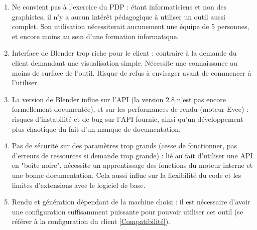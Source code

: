 \documentclass[a4paper]{article}
\begin{document}
    \begin{enumerate}
                
                \item {Ne convient pas à l'exercice du PDP :}
                étant informaticiens et non des graphistes, il n'y a aucun intérêt pédagogique à utiliser un outil aussi complet. Son utilisation nécessiterait aucunement une équipe de 5 personnes, et encore moins au sein d'une formation informatique.
                
                \item {Interface de Blender trop riche pour le client :}
                contraire à la demande du client demandant une visualisation simple. Nécessite une connaissance au moins de surface de l'outil. Risque de refus à envisager avant de commencer à l'utiliser.
                
                \item {La version de Blender influe sur l'API (la version 2.8 n'est pas encore formellement documentée), et sur les performances de rendu (moteur Evee) :}
                risques d'instabilité et de bug sur l'API fournie, ainsi qu'un développement plus chaotique du fait d'un manque de documentation.
                
                \item {Pas de sécurité sur des paramètres trop grands (cesse de fonctionner, pas d'erreurs de ressources si demande trop grande) :}
                lié au fait d'utiliser une API en "boîte noire", nécessite un apprentissage des fonctions du moteur interne et une bonne documentation. Cela aussi influe sur la flexibilité du code et les limites d'extensions avec le logiciel de base.
                
                \item {Rendu et génération dépendant de la machine choisi :}
                il est nécessaire d'avoir une configuration suffisamment puissante pour pouvoir utiliser cet outil (se référer à la configuration du client \ref{Compatibilité}).
                
    \end{enumerate}
    
\end{document}
